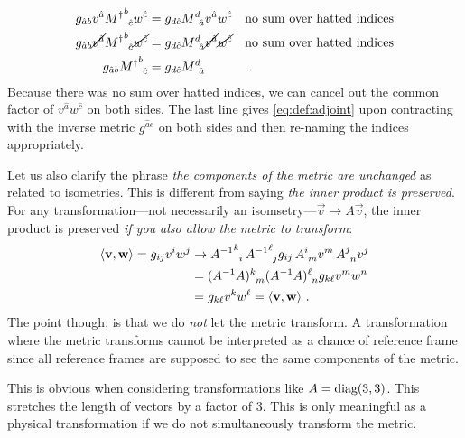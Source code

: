 \documentclass[12pt, oneside]{report}    %
\begin{document}
\begin{example}
\begin{align}
    g_{\hat ab} {v^{\hat a}} {M^\dag}\aij{b}{\hat c} {w^{\hat c}}
    &= 
    g_{d\hat c} M\aij{d}{\hat a} {v^{\hat a}} {w^{\hat c}}
    &&
    \text{no sum over hatted indices}
    \\
    g_{\hat ab} \cancel{v^{\hat a}} {M^\dag}\aij{b}{\hat c} \cancel{w^{\hat c}}
    &= 
    g_{d\hat c} M\aij{d}{\hat a} \cancel{v^{\hat a}} \cancel{w^{\hat c}}
    &&
    \text{no sum over hatted indices}
    \\
    g_{\hat ab} {M^\dag}\aij{b}{\hat c} 
    &= 
    g_{d\hat c} M\aij{d}{\hat a} 
    &&
    \ .
\end{align}
Because there was no sum over hatted indices, we can cancel out the common factor of $v^{\hat a}w^{\hat c}$ on both sides.  The last line gives \eqref{eq:def:adjoint} upon contracting with the inverse metric $g^{\hat a e}$ on both sides and then re-naming the indices appropriately.\footnotemark
\end{example}
% 

\begin{example}
Let us also clarify the phrase \emph{the components of the metric are unchanged} as related to isometries. This is different from saying \emph{the inner product is preserved}. For any transformation---not necessarily an isomsetry---$\vec{v}\to A\vec{v}$, the inner product is preserved \emph{if you also allow the metric to transform}:
\begin{align}
    \la \vec{v}, \vec{w}\ra
    = 
    g_{ij}v^i w^j
    &\to 
    {A\inv}\aij{k}{i}\, {A\inv}\aij{\ell}{j}
    g_{ij}
    \,
    A\aij{i}{m} v^m \, A\aij{j}{n}v^j
    \\
    &= ({A\inv} A)\aij{k}{m} ({A\inv} A)\aij{\ell}{n} g_{k\ell} v^m w^n
    \\
    &= g_{k\ell} v^k w^\ell 
    =\la \vec{v},\vec{w} \ra
    \ .
\end{align}
The point though, is that we do \emph{not} let the metric transform. A transformation where the metric transforms cannot be interpreted as a chance of reference frame since all reference frames are supposed to see the same components of the metric. 

This is obvious when considering transformations like $A = \textnormal{diag}(3,3)$. This stretches the length of vectors by a factor of 3. This is only meaningful as a physical transformation if we do not simultaneously transform the metric.
\end{example}
\end{document}
